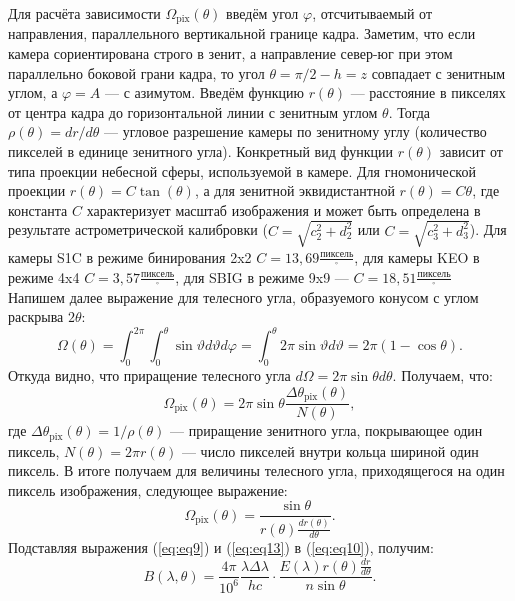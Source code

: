 \documentclass[12pt,a4paper]{article}
\begin{document}
Для расчёта зависимости $\Omega_{\text{pix}}(\theta)$ введём угол $\varphi$, отсчитываемый от направления, параллельного вертикальной границе кадра. Заметим, что если камера сориентирована строго в зенит, а направление север-юг при этом параллельно боковой грани кадра, то угол $\theta=\pi / 2 - h = z$ совпадает с зенитным углом, а $\varphi = A$ --- с азимутом. Введём функцию $r(\theta)$ --- расстояние в пикселях от центра кадра до горизонтальной линии с зенитным углом $\theta$. Тогда $\rho(\theta)=dr/d\theta$ --- угловое разрешение камеры по зенитному углу (количество пикселей в единице зенитного угла). Конкретный вид функции $r(\theta)$ зависит от типа проекции небесной сферы, используемой в камере. Для гномонической проекции $r(\theta)=C \tan (\theta)$, а для зенитной эквидистантной $r(\theta)=C\theta$, где константа $C$ характеризует масштаб изображения и может быть определена в результате астрометрической калибровки ($C=\sqrt{c_2^2+d_2^2}$ или $C=\sqrt{c_3^2+d_3^2}$). Для камеры S1C в режиме бинирования 2x2 $C=13,69 \frac{\text{пиксель}}{^{\circ}}$, для камеры KEO в режиме 4x4 $C= 3,57 \frac{\text{пиксель}}{^{\circ}}$, для SBIG в режиме 9x9 --- $C=18,51 \frac{\text{пиксель}}{^{\circ}}$   Напишем далее выражение для телесного угла, образуемого конусом с углом раскрыва $2\theta$:
\begin{equation}\label{eq:eq11}
\Omega (\theta)= \int_{0}^{2\pi} \int_{0}^{\theta} \sin\vartheta d\vartheta d\varphi = \int_{0}^{\theta} 2\pi\sin{\vartheta} d\vartheta=2\pi(1-\cos\theta).
\end{equation}
Откуда видно, что приращение телесного угла $d\Omega = 2\pi\sin{\theta}d\theta$. Получаем, что:  
\begin{equation}\label{eq:eq12}
\Omega_\text{pix} (\theta)= 2\pi\sin{\theta} \frac{\Delta\theta_\text{pix}(\theta)}{N(\theta)},
\end{equation}
где $\Delta\theta_\text{pix}(\theta)=1/\rho(\theta)$ --- приращение зенитного угла, покрывающее один пиксель, $N(\theta) = 2\pi r(\theta)$ --- число пикселей внутри кольца шириной один пиксель. В итоге получаем для величины телесного угла, приходящегося на один пиксель изображения, следующее выражение:
\begin{equation}\label{eq:eq13}
\Omega_\text{pix} (\theta)= \frac{\sin{\theta}}{r(\theta) \frac{dr(\theta)}{d\theta}}.
\end{equation}
Подставляя выражения (\ref{eq:eq9}) и (\ref{eq:eq13}) в (\ref{eq:eq10}), получим:
\begin{equation}\label{eq:eq14}
B(\lambda,\theta) = \frac {4\pi}{10^6} \frac{\lambda\Delta\lambda}{hc}\cdot \frac{E(\lambda) r(\theta)\frac{dr}{d\theta}} {n \sin\theta}.
\end{equation}
\end{document}
